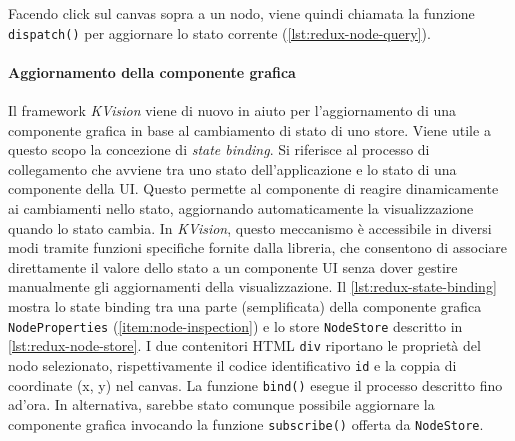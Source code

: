 
Facendo click sul canvas sopra a un nodo, viene quindi chiamata la funzione \texttt{dispatch()} per aggiornare lo stato corrente (\cref{lst:redux-node-query}).



\newpage
\paragraph{Aggiornamento della componente grafica}
Il framework \textit{KVision} viene di nuovo in aiuto per l'aggiornamento di una componente grafica in base al cambiamento di stato di uno store. Viene utile a questo scopo la concezione di \textit{state binding}. Si riferisce al processo di collegamento che avviene tra uno stato dell'applicazione e lo stato di una componente della \ac{UI}.  Questo permette al componente di reagire dinamicamente ai cambiamenti nello stato, aggiornando automaticamente la visualizzazione quando lo stato cambia. In \textit{KVision}, questo meccanismo è accessibile in diversi modi tramite funzioni specifiche fornite dalla libreria, che consentono di associare direttamente il valore dello stato a un componente \ac{UI} senza dover gestire manualmente gli aggiornamenti della visualizzazione. Il \cref{lst:redux-state-binding} mostra lo state binding tra una parte (semplificata) della componente grafica \texttt{NodeProperties} (\cref{item:node-inspection}) e lo store \texttt{NodeStore} descritto in \cref{lst:redux-node-store}. I due contenitori HTML \texttt{div} riportano le proprietà del nodo selezionato, rispettivamente il codice identificativo \texttt{id} e la coppia di coordinate (x, y) nel canvas.
La funzione \texttt{bind()} esegue il processo descritto fino ad'ora. In alternativa, sarebbe stato comunque possibile aggiornare la componente grafica invocando la funzione \texttt{subscribe()} offerta da \texttt{NodeStore}. 



